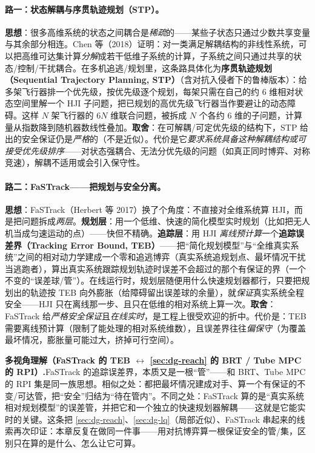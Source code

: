 \paragraph{路一：状态解耦与序贯轨迹规划（STP）。}
\textbf{思想}：很多高维系统的状态之间耦合是\emph{稀疏}的——某些子状态只通过少数共享变量与其余部分相连。Chen 等（2018）证明：对一类满足解耦结构的非线性系统，可以把高维可达集计算\emph{分解}成若干低维子系统的计算，子系统之间只通过共享的状态/控制/干扰耦合\cite{chen2018decomposition}。在多机追逃/规划里，这条路具体化为\textbf{序贯轨迹规划（Sequential Trajectory Planning, STP）}（含对抗入侵者下的鲁棒版本\cite{chen2017robust}）：给多架飞行器排一个优先级，按优先级逐个规划，每架只需在自己的约 6 维相对状态空间里解一个 HJI 子问题，把已规划的高优先级飞行器当作要避让的动态障碍。这样 $N$ 架飞行器的 $6N$ 维联合问题，被拆成 $N$ 个各约 6 维的子问题，计算量从指数降到随机器数线性叠加。\textbf{取舍}：在可解耦/可定优先级的结构下，STP 给出的安全保证仍是\emph{严格}的（不是近似）。代价是它\emph{要求系统具备这种解耦结构或可接受优先级排序}——对状态强耦合、无法分优先级的问题（如真正同时博弈、对称竞速），解耦不适用或会引入保守性。

\paragraph{路二：FaSTrack——把规划与安全分离。}
\textbf{思想}：FaSTrack（Herbert 等 2017）换了个角度：不直接对全维系统算 HJI，而是把问题拆成\emph{两层}\cite{herbert2017fastrack}。\textbf{规划层}：用一个低维、快速的简化模型实时规划（比如把无人机当成匀速运动的点）——快但不精确。\textbf{追踪层}：用 HJI \emph{离线预计算}一个\textbf{追踪误差界（Tracking Error Bound, TEB）}——把“简化规划模型”与“全维真实系统”之间的相对动力学建成一个零和追逃博弈（真实系统追规划点、最坏情况干扰当逃跑者），算出真实系统跟踪规划轨迹时误差不会超过的那个有保证的界（一个不变的“误差球/管”）。在线运行时，规划层随便用什么快速规划器都行，只要把规划出的轨迹按 TEB 向外膨胀（给障碍留出误差球的余量），就\emph{保证}真实系统全程安全——HJI 只在离线那一步、且只在低维的相对系统上算一次。\textbf{取舍}：FaSTrack 给\emph{严格安全保证}且\emph{在线实时}，是工程上很受欢迎的折中。代价是：TEB 需要离线预计算（限制了能处理的相对系统维数），且误差界往往\emph{偏保守}（为覆盖最坏情况，膨胀量可能过大，挤掉可行空间）。

\begin{note}
\textbf{多视角理解（FaSTrack 的 TEB $\leftrightarrow$ \cref{sec:dg-reach} 的 BRT / Tube MPC 的 RPI）.}\;FaSTrack 的追踪误差界，本质又是一根“管”——和 BRT、Tube MPC 的 RPI 集是同一族思想。相似之处：都把最坏情况建成对手、算一个有保证的不变/可达管，把“安全”归结为“待在管内”。不同之处：FaSTrack 算的是“真实系统相对规划模型”的误差管，并把它和一个独立的快速规划器解耦——这就是它能实时的关键。这条把 \cref{sec:dg-reach}、\cref{sec:dg-lq}（局部近似）、FaSTrack 串起来的线索再次印证：本章反复在做同一件事——用对抗博弈算一根保证安全的管/集，区别只在算的是什么、怎么让它可算。
\end{note}

